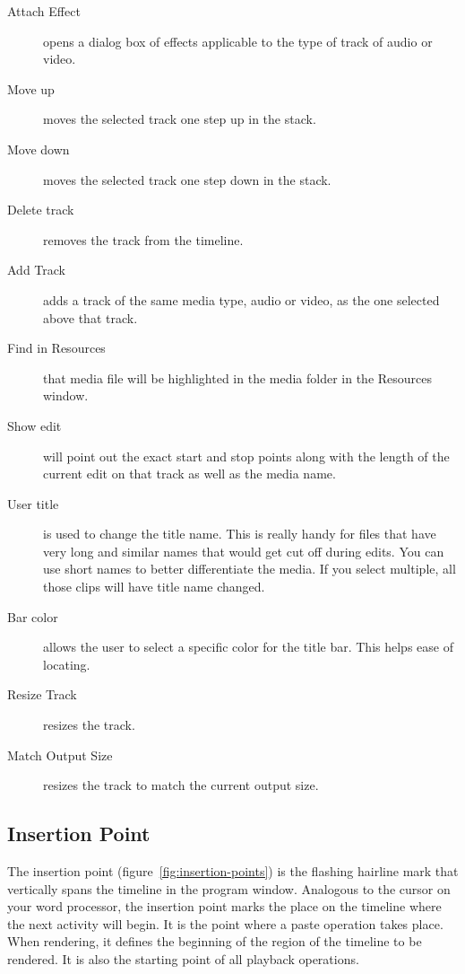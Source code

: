 \begin{description}
    \item[Attach Effect] opens a dialog box of effects applicable to the type of track of audio or video.
    \item[Move up] moves the selected track one step up in the stack.
    \item[Move down]  moves the selected track one step down in the stack.
    \item[Delete track]  removes the track from the timeline.
    \item[Add Track]  adds a track of the same media type, audio or video, as the one selected above that track.
    \item[Find in Resources]  that media file will be highlighted in the media folder in the Resources window.
    \item[Show edit]  will point out the exact start and stop points along with the length of the current edit on
        that track as well as the media name.
    \item[User title]  is used to change the title name.  This is really handy for files that have very long and
        similar names that would get cut off during edits.  You can use short names to better differentiate the
        media. If you select multiple, all those clips will have title name changed.
    \item[Bar color]  allows the user to select a specific color for the title bar.  This helps ease of locating.
    \item[Resize Track]  resizes the track.
    \item[Match Output Size]  resizes the track to match the current output size.
\end{description}


\subsection{Insertion Point}%
\label{sub:insertion_point}

The insertion point (figure~\ref{fig:insertion-points}) is the flashing hairline mark that vertically spans the timeline in the program window. 
Analogous to the cursor on your word processor, the insertion point marks the place on the timeline where the next activity will begin. 
It is the point where a paste operation takes place. 
When rendering, it defines the beginning of the region of the timeline to be rendered. It is also the starting point of all playback operations.

